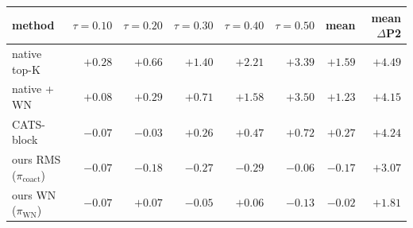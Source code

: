 \setlength{\tabcolsep}{4pt}
\begin{tabular}{lrrrrrrr}
\toprule
method & $\tau{=}0.10$ & $\tau{=}0.20$ & $\tau{=}0.30$ & $\tau{=}0.40$ & $\tau{=}0.50$ & mean & mean $\Delta$P2 \\
\midrule
native top-K & $+0.28$ & $+0.66$ & $+1.40$ & $+2.21$ & $+3.39$ & $+1.59$ & $+4.49$ \\
native + WN & $+0.08$ & $+0.29$ & $+0.71$ & $+1.58$ & $+3.50$ & $+1.23$ & $+4.15$ \\
CATS-block & $\mathbf{-0.07}$ & $-0.03$ & $+0.26$ & $+0.47$ & $+0.72$ & $+0.27$ & $+4.24$ \\
ours RMS ($\pi_{\mathrm{coact}}$) & $-0.07$ & $\mathbf{-0.18}$ & $\mathbf{-0.27}$ & $\mathbf{-0.29}$ & $-0.06$ & $-0.17$ & $+3.07$ \\
ours WN ($\pi_{\mathrm{WN}}$) & $-0.07$ & $+0.07$ & $-0.05$ & $+0.06$ & $\mathbf{-0.13}$ & $-0.02$ & $+1.81$ \\
\bottomrule
\end{tabular}

